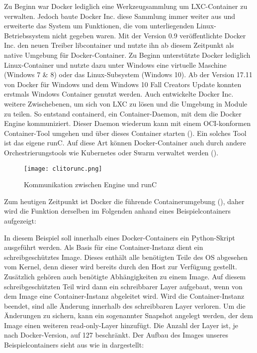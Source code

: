 Zu Beginn war Docker lediglich eine Werkzeugsammlung um \ac{LXC}-Container zu verwalten. Jedoch baute Docker Inc. diese Sammlung immer weiter aus und erweiterte das System um Funktionen, die vom unterliegenden Linux-Betriebssystem nicht gegeben waren. Mit der Version 0.9 veröffentlichte Docker Inc. den neuen Treiber libcontainer und nutzte ihn ab diesem Zeitpunkt als native Umgebung für Docker-Container. \citep{dockerblog2} Zu Beginn unterstützte Docker lediglich Linux-Container und nutzte dazu unter Windows eine virtuelle Maschine (Windows 7 \& 8) oder das Linux-Subsystem (Windows 10). Ab der Version 17.11 von Docker für Windows und dem Windows 10 Fall Creators Update konnten erstmals Windows Container genutzt werden. \citep{dockerblogwin} Auch entwickelte Docker Inc. weitere Zwischebenen, um sich von \ac{LXC} zu lösen und die Umgebung in Module zu teilen. So entstand containerd, ein Container-Daemon, mit dem die Docker Engine kommuniziert. Dieser Daemon wiederum kann mit einem OCI-konformen Container-Tool umgehen und über dieses Container starten (\Vgl {}). Ein solches Tool ist das eigene runC. Auf diese Art können Docker-Container auch durch andere Orchestrierungstools wie Kubernetes oder Swarm verwaltet werden (\Vgl {}). \citep{Buch}

\begin{figure}[h]
    \begin{center}
        \texttt{[image: clitorunc.png]}
    \end{center}
    \caption[Kommunikation zwischen Engine und runC]{Kommunikation zwischen Engine und runC}
    \label{fig:containerrunc}
\end{figure}

Zum heutigen Zeitpunkt ist Docker die führende Containerumgebung (\Vgl {}), daher wird die Funktion derselben im Folgenden anhand eines Beispielcontainers aufgezeigt:

In diesem Beispiel soll innerhalb eines Docker-Containers ein Python-Skript ausgeführt werden. Als Basis für eine Container-Instanz dient ein schreibgeschütztes Image. Dieses enthält alle benötigten Teile des OS abgesehen vom Kernel, denn dieser wird bereits durch den Host zur Verfügung gestellt. Zusätzlich gehören auch benötigte Abhängigkeiten zu einem Image. Auf diesem schreibgeschützten Teil wird dann ein schreibbarer Layer aufgebaut, wenn von dem Image eine Container-Instanz abgeleitet wird. Wird die Container-Instanz beendet, sind alle Änderung innerhalb des schreibbaren Layer verloren. Um die Änderungen zu sichern, kann ein sogenannter Snapshot angelegt werden, der dem Image einen weiteren read-only-Layer hinzufügt. Die Anzahl der Layer ist, je nach Docker-Version, auf 127 beschränkt. \citep{Buch, dockermanual} Der Aufbau des Images unseres Beispielcontainers sieht aus wie in  dargestellt:

